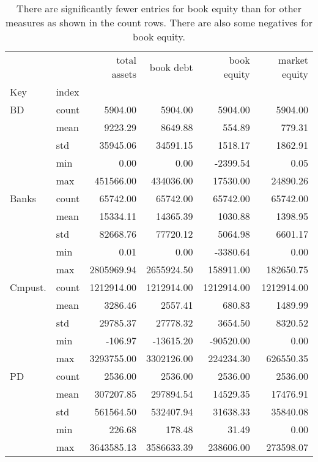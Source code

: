 \begin{table}
\caption{
    There are significantly fewer entries for book equity
    than for other measures as shown in the count rows.
    There are also some negatives for book equity.
    }
\label{tab:Table 2.1}
\begin{tabular}{llrrrr}
\toprule
 &  & total assets & book debt & book equity & market equity \\
Key & index &  &  &  &  \\
\midrule
{BD} & count & 5904.00 & 5904.00 & 5904.00 & 5904.00 \\
 & mean & 9223.29 & 8649.88 & 554.89 & 779.31 \\
 & std & 35945.06 & 34591.15 & 1518.17 & 1862.91 \\
 & min & 0.00 & 0.00 & -2399.54 & 0.05 \\
 & max & 451566.00 & 434036.00 & 17530.00 & 24890.26 \\
\cline{1-6}
{Banks} & count & 65742.00 & 65742.00 & 65742.00 & 65742.00 \\
 & mean & 15334.11 & 14365.39 & 1030.88 & 1398.95 \\
 & std & 82668.76 & 77720.12 & 5064.98 & 6601.17 \\
 & min & 0.01 & 0.00 & -3380.64 & 0.00 \\
 & max & 2805969.94 & 2655924.50 & 158911.00 & 182650.75 \\
\cline{1-6}
{Cmpust.} & count & 1212914.00 & 1212914.00 & 1212914.00 & 1212914.00 \\
 & mean & 3286.46 & 2557.41 & 680.83 & 1489.99 \\
 & std & 29785.37 & 27778.32 & 3654.50 & 8320.52 \\
 & min & -106.97 & -13615.20 & -90520.00 & 0.00 \\
 & max & 3293755.00 & 3302126.00 & 224234.30 & 626550.35 \\
\cline{1-6}
{PD} & count & 2536.00 & 2536.00 & 2536.00 & 2536.00 \\
 & mean & 307207.85 & 297894.54 & 14529.35 & 17476.91 \\
 & std & 561564.50 & 532407.94 & 31638.33 & 35840.08 \\
 & min & 226.68 & 178.48 & 31.49 & 0.00 \\
 & max & 3643585.13 & 3586633.39 & 238606.00 & 273598.07 \\
\cline{1-6}
\bottomrule
\end{tabular}
\end{table}
